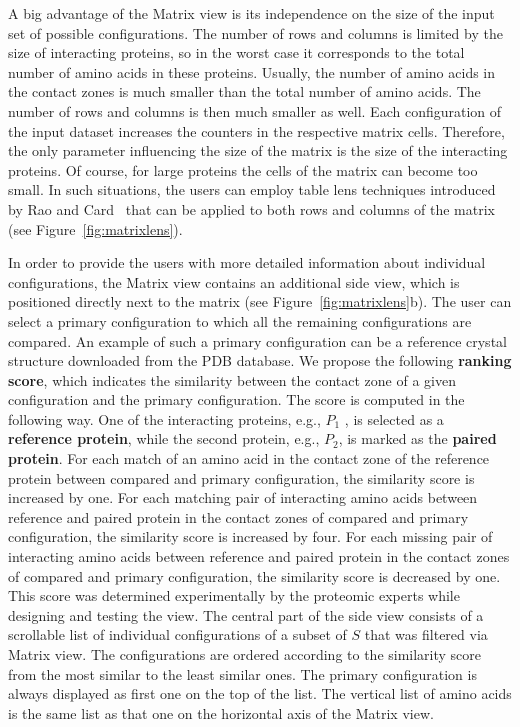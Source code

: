 \documentclass{bmcart}
\def\MatView {Matrix view\xspace}
\begin{document}
A big advantage of the \MatView is its independence on the size of the input set of possible configurations.
The number of rows and columns is limited by the size of interacting proteins, so in the worst case it corresponds to the total number of amino acids in these proteins.
Usually, the number of amino acids in the contact zones is much smaller than the total number of amino acids.
The number of rows and columns is then much smaller as well.
Each configuration of the input dataset increases the counters in the respective matrix cells.
Therefore, the only parameter influencing the size of the matrix is the size of the interacting proteins.
Of course, for large proteins the cells of the matrix can become too small.
In such situations, the users can employ table lens techniques introduced by Rao and Card~\cite{Rao1994} that can be applied to both rows and columns of the matrix (see Figure~\ref{fig:matrixlens}).

In order to provide the users with more detailed information about individual configurations, the \MatView contains an additional side view, which is positioned directly next to the matrix (see Figure~\ref{fig:matrixlens}b).
The user can select a primary configuration to which all the remaining configurations are compared.
An example of such a primary configuration can be a reference crystal structure downloaded from the PDB database.
We propose the following \textbf{ranking score}, which indicates the similarity between the contact zone of a given configuration and the primary configuration.
The score is computed in the following way.
One of the interacting proteins, e.g., $P_1$ , is selected as a \textbf{reference protein}, while the second protein, e.g., $P_2$, is marked as the \textbf{paired protein}.
For each match of an amino acid in the contact zone of the reference protein between compared and primary configuration, the similarity score is increased by one.
For each matching pair of interacting amino acids between reference and paired protein in the contact zones of compared and primary configuration, the similarity score is increased by four.
For each missing pair of interacting amino acids between reference and paired protein in the contact zones of compared and primary configuration, the similarity score is decreased by one.
This score was determined experimentally by the proteomic experts while designing and testing the view. 
The central part of the side view consists of a scrollable list of individual configurations of a subset of $S$ that was filtered via \MatView.
The configurations are ordered according to the similarity score from the most similar to the least similar ones.
The primary configuration is always displayed as first one on the top of the list.
The vertical list of amino acids is the same list as that one on the horizontal axis of the \MatView.
\end{document}
